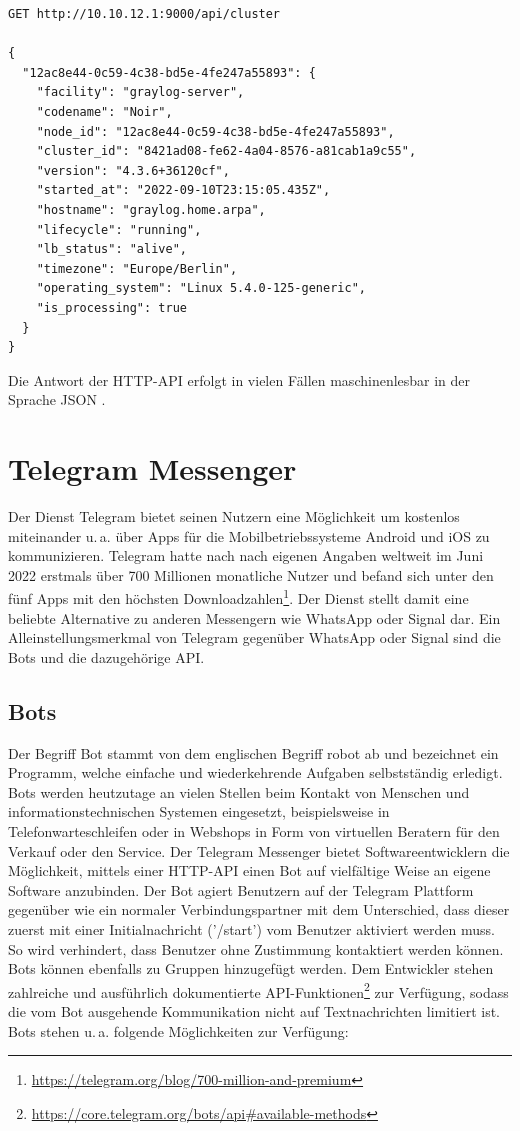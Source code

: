 \begin{lstlisting}[caption={Beispiel eines Aufrufs der Graylog REST-API.}, label=bsp-rest-api, numbers=none]
GET http://10.10.12.1:9000/api/cluster

{
  "12ac8e44-0c59-4c38-bd5e-4fe247a55893": {
    "facility": "graylog-server",
    "codename": "Noir",
    "node_id": "12ac8e44-0c59-4c38-bd5e-4fe247a55893",
    "cluster_id": "8421ad08-fe62-4a04-8576-a81cab1a9c55",
    "version": "4.3.6+36120cf",
    "started_at": "2022-09-10T23:15:05.435Z",
    "hostname": "graylog.home.arpa",
    "lifecycle": "running",
    "lb_status": "alive",
    "timezone": "Europe/Berlin",
    "operating_system": "Linux 5.4.0-125-generic",
    "is_processing": true
  }
}
\end{lstlisting}

Die Antwort der HTTP-API erfolgt in vielen Fällen maschinenlesbar in der Sprache JSON \cite[S. 281]{swdev}.

\section{Telegram Messenger}

Der Dienst Telegram bietet seinen Nutzern eine Möglichkeit um kostenlos miteinander u.\,a. über Apps für die Mobilbetriebssysteme Android und iOS zu kommunizieren. Telegram hatte nach nach eigenen Angaben weltweit im Juni 2022 erstmals über 700 Millionen monatliche Nutzer und befand sich unter den fünf Apps mit den höchsten Downloadzahlen\footnote{\url{https://telegram.org/blog/700-million-and-premium}}. Der Dienst stellt damit eine beliebte Alternative zu anderen Messengern wie WhatsApp oder Signal dar. Ein Alleinstellungsmerkmal von Telegram gegenüber WhatsApp oder Signal sind die Bots und die dazugehörige API.

\subsection{Bots}

Der Begriff Bot stammt von dem englischen Begriff robot ab und bezeichnet ein Programm, welche einfache und wiederkehrende Aufgaben selbstständig erledigt. Bots werden heutzutage an vielen Stellen beim Kontakt von Menschen und informationstechnischen Systemen eingesetzt, beispielsweise in Telefonwarteschleifen oder in Webshops in Form von virtuellen Beratern für den Verkauf oder den Service. Der Telegram Messenger bietet Softwareentwicklern die Möglichkeit, mittels einer HTTP-API einen Bot auf vielfältige Weise an eigene Software anzubinden. Der Bot agiert Benutzern auf der Telegram Plattform gegenüber wie ein normaler Verbindungspartner mit dem Unterschied, dass dieser zuerst mit einer Initialnachricht ('/start') vom Benutzer aktiviert werden muss. So wird verhindert, dass  Benutzer ohne Zustimmung kontaktiert werden können. Bots können ebenfalls zu Gruppen hinzugefügt werden. Dem Entwickler stehen zahlreiche und ausführlich dokumentierte API-Funktionen\footnote{\url{https://core.telegram.org/bots/api\#available-methods}} zur Verfügung, sodass die vom Bot ausgehende Kommunikation nicht auf Textnachrichten limitiert ist. Bots stehen u.\,a. folgende Möglichkeiten zur Verfügung:

